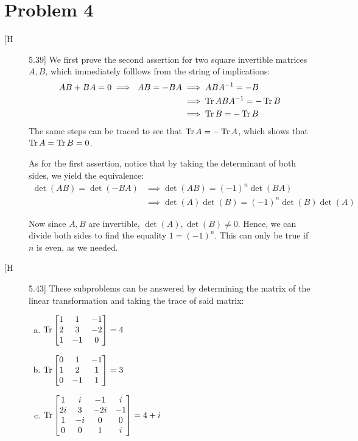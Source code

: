 \documentclass[12pt]{article}%
\begin{document}
\section*{Problem 4}
\begin{description}
  \item[[H] 5.39] We first prove the second assertion for two square invertible matrices $A,B$, which immediately folllows from the string of implications:
  \begin{align*}
    AB + BA = 0 \implies \ AB = - BA & \implies ABA^{-1} = -B \\ & \implies \Tr ABA^{-1} = - \Tr B \\ & \implies \Tr B = - \Tr B
  \end{align*}
  The same steps can be traced to see that $\Tr A = - \Tr A$, which shows that $\Tr A = \Tr B = 0$.

  As for the first assertion, notice that by taking the determinant of both sides, we yield the equivalence:
  \begin{align*}
  \det(AB) = \det(-BA) & \implies \det(AB) = (-1)^n \det(BA) \\
  & \implies \det(A)\det(B) = (-1)^n \det(B)\det(A)
  \end{align*}

  Now since $A,B$ are invertible, $\det(A), \det(B) \neq 0$. Hence, we can divide both sides to find the equality $1 = (-1)^n$. This can only be true if $n$ is even, as we needed.

  \item[[H] 5.43] These subproblems can be answered by determining the matrix of the linear transformation and taking the trace of said matrix:
  \begin{enumerate}[a.]
    \item $\Tr \begin{bmatrix}
      1 & 1 & -1 \\
      2 & 3 & -2 \\
      1 &  -1 & 0
    \end{bmatrix} = 4$
    \item $\Tr \begin{bmatrix}
      0 & 1 & -1 \\
      1 & 2 & 1 \\
      0 &  -1 & 1
    \end{bmatrix} = 3$
    \item $\Tr \begin{bmatrix}
      1 & i & -1 & i \\
      2i & 3 & -2i & -1 \\
      1 & -i & 0 & 0 \\
      0 &  0 & 1 & i
    \end{bmatrix} = 4 + i$
  \end{enumerate}


\end{description}
\end{document}
